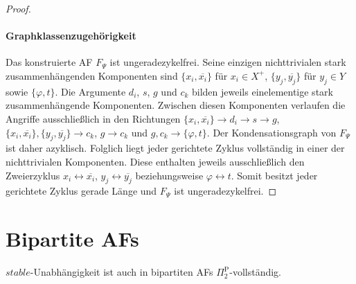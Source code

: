 \begin{proof}
    \paragraph{Graphklassenzugehörigkeit}
    Das konstruierte AF \(F_{\Psi}\) ist ungeradezykelfrei. 
    Seine einzigen nichttrivialen stark zusammenhängenden Komponenten sind
    \(\{x_i,\overline{x_i}\}\) für \(x_i\in X^{+}\),
    \(\{y_j,\overline{y_j}\}\) für \(y_j\in Y\) sowie
    \(\{\varphi,t\}\).
    Die Argumente \(d_i\), \(s\), \(g\) und \(c_k\) bilden jeweils
    einelementige stark zusammenhängende Komponenten.
    Zwischen diesen Komponenten verlaufen die Angriffe ausschließlich in den
    Richtungen
    \(\{x_i,\overline{x_i}\}\to d_i\to s\to g\),
    \(\{x_i,\overline{x_i}\},\{y_j,\overline{y_j}\}\to c_k\),
    \(g\to c_k\) und
    \(g,c_k\to\{\varphi,t\}\).
    Der Kondensationsgraph von \(F_{\Psi}\) ist daher azyklisch.
    Folglich liegt jeder gerichtete Zyklus vollständig in einer der
    nichttrivialen Komponenten. Diese enthalten jeweils ausschließlich den
    Zweierzyklus
    \(x_i\leftrightarrow\overline{x_i}\),
    \(y_j\leftrightarrow\overline{y_j}\) beziehungsweise
    \(\varphi\leftrightarrow t\).
    Somit besitzt jeder gerichtete Zyklus gerade Länge und
    \(F_{\Psi}\) ist ungeradezykelfrei.
\end{proof}

\newpage

\section{Bipartite AFs}
\begin{Proposition}
\label{prop:bip-st-ind-hard}
    \(stable\)-Unabhängigkeit ist auch in bipartiten AFs \(\Pi_2^\text{P}\)-vollständig.
\end{Proposition}

